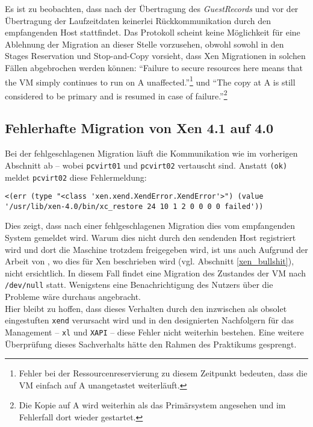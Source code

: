 \label{xen_bullshit}
Es ist zu beobachten, dass nach der Übertragung des \emph{GuestRecords} und vor der Übertragung der Laufzeitdaten keinerlei Rückkommunikation durch den empfangenden Host stattfindet. Das Protokoll scheint keine Möglichkeit für eine Ablehnung der Migration an dieser Stelle vorzusehen, obwohl \cite{clark2005live} sowohl in den Stages Reservation und Stop-and-Copy vorsieht, dass Xen Migrationen in solchen Fällen abgebrochen werden können: ``Failure to secure resources here means that the VM simply continues to run on A unaffected.''\footnote{Fehler bei der Ressourcenreservierung zu diesem Zeitpunkt bedeuten, dass die VM einfach auf A unangetastet weiterläuft.}\cite{clark2005live} und ``The copy at A is still considered to be primary and is resumed in case of failure.''\footnote{Die Kopie auf A wird weiterhin als das Primärsystem angesehen und im Fehlerfall dort wieder gestartet.}\cite{clark2005live}


\subsection{Fehlerhafte Migration von Xen 4.1 auf 4.0}
Bei der fehlgeschlagenen Migration läuft die Kommunikation wie im vorherigen Abschnitt ab -- wobei \verb#pcvirt01# und \verb#pcvirt02# vertauscht sind. Anstatt \verb#(ok)# meldet \verb#pcvirt02# diese Fehlermeldung:
\setupVerbatimOut
\begin{verbatim}
<(err (type "<class 'xen.xend.XendError.XendError'>") (value '/usr/lib/xen-4.0/bin/xc_restore 24 10 1 2 0 0 0 0 failed'))
\end{verbatim}

Dies zeigt, dass nach einer fehlgeschlagenen Migration dies vom empfangenden System gemeldet wird. Warum dies nicht durch den sendenden Host registriert wird und dort die Maschine trotzdem freigegeben wird, ist uns auch Aufgrund der Arbeit von \cite{clark2005live}, wo dies für Xen beschrieben wird (vgl. Abschnitt \ref{xen_bullshit}), nicht ersichtlich. In diesem Fall findet eine Migration des Zustandes der VM nach \verb#/dev/null# statt. Wenigstens eine Benachrichtigung des Nutzers über die Probleme wäre durchaus angebracht.
\\
Hier bleibt zu hoffen, dass dieses Verhalten durch den inzwischen als obsolet eingestuften \verb#xend# verursacht wird und in den designierten Nachfolgern für das Management -- \verb#xl# und \verb#XAPI# -- diese Fehler nicht weiterhin bestehen. Eine weitere Überprüfung dieses Sachverhalts hätte den Rahmen des Praktikums gesprengt.

